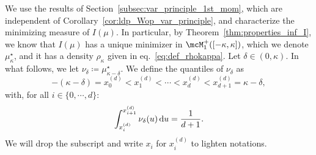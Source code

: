 \myskip 
We use the results of Section~\ref{subsec:var_principle_1st_mom}, which are independent of Corollary~\ref{cor:ldp_Wop_var_principle}, and characterize the minimizing measure of $I(\mu)$.
In particular, by Theorem~\ref{thm:properties_inf_I}, we know that $I(\mu)$ has a unique minimizer in $\mcM_1^+([-\kappa, \kappa])$, which we denote $\mu_\kappa^\star$, 
and it has a density $\rho_\kappa$ given in eq.~\eqref{eq:def_rhokappa}.
Let $\delta \in (0,\kappa)$.
In what follows, we let $\nu_\delta \coloneqq \mu^\star_{\kappa - \delta}$.
We define the quantiles of $\nu_\delta$ as 
\begin{equation*}
    -(\kappa-\delta) = x_0^{(d)} < x_1^{(d)} < \cdots < x_d^{(d)} < x_{d+1}^{(d)} = \kappa - \delta, 
\end{equation*}
with, for all $i \in \{0, \cdots, d\}$:
\begin{equation*}
    \int_{x_i^{(d)}}^{x_{i+1}^{(d)}} \nu_\delta(u) \, \mathrm{d} u = \frac{1}{d+1}. 
\end{equation*}
We will drop the subscript and write $x_i$ for $x_i^{(d)}$ to lighten notations.

